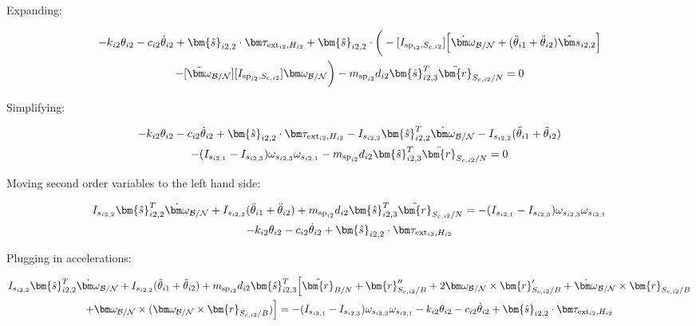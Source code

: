 Expanding:

\begin{multline}
	-k_{i2} \theta_{i2} - c_{i2} \dot{\theta}_{i2} + \bm{\hat{s}}_{i2,2} \cdot \bm \tau_{\text{ext}_{i2},H_{i2}} + \bm{\hat{s}}_{i2,2} \cdot \bigg(-[I_{\text{sp}_{i2},S_{c,i2}}] \Big[\dot{\bm \omega}_{\cal{B/N}} + (\ddot{\theta}_{i1}  + \ddot{\theta}_{i2})\hat{\bm s}_{i2,2}\Big]  \\
	-[\tilde{\bm \omega}_{\cal{B/N}}] [I_{\text{sp}_{i2},S_{c,i2}}] \bm \omega_{\cal{B/N}} \bigg)
	- m_{\text{sp}_{i2}} d_{i2}\bm{\hat{s}}_{i2,3}^T \ddot{\bm{r}}_{S_{c,i2}/N} = 0
\end{multline}

Simplifying:

\begin{multline}
	-k_{i2} \theta_{i2} - c_{i2} \dot{\theta}_{i2} + \bm{\hat{s}}_{i2,2} \cdot \bm \tau_{\text{ext}_{i2},H_{i2}} - I_{s_{i2,2}} \bm{\hat{s}}_{i2,2}^T \dot{\bm \omega}_{\cal{B/N}} - I_{s_{i2,2}} (\ddot{\theta}_{i1}  + \ddot{\theta}_{i2})  \\
	- (I_{s_{i2,1}} - I_{s_{i2,3}}) \omega_{s_{i2,3}} \omega_{s_{i2,1}}
	- m_{\text{sp}_{i2}} d_{i2}\bm{\hat{s}}_{i2,3}^T \ddot{\bm{r}}_{S_{c,i2}/N} = 0
\end{multline}

Moving second order variables to the left hand side:

\begin{multline}
	I_{s_{i2,2}} \bm{\hat{s}}_{i2,2}^T \dot{\bm \omega}_{\cal{B/N}} + I_{s_{i2,2}} (\ddot{\theta}_{i1}  + \ddot{\theta}_{i2}) + m_{\text{sp}_{i2}} d_{i2}\bm{\hat{s}}_{i2,3}^T \ddot{\bm{r}}_{S_{c,i2}/N} = - (I_{s_{i2,1}} - I_{s_{i2,3}}) \omega_{s_{i2,3}} \omega_{s_{i2,1}} \\-k_{i2} \theta_{i2} - c_{i2} \dot{\theta}_{i2}
	+ \bm{\hat{s}}_{i2,2} \cdot \bm \tau_{\text{ext}_{i2},H_{i2}}
\end{multline}

Plugging in accelerations:

\begin{multline}
	I_{s_{i2,2}} \bm{\hat{s}}_{i2,2}^T \dot{\bm \omega}_{\cal{B/N}} + I_{s_{i2,2}} (\ddot{\theta}_{i1}  + \ddot{\theta}_{i2}) + m_{\text{sp}_{i2}} d_{i2}\bm{\hat{s}}_{i2,3}^T \Big[\ddot{\bm{r}}_{B/N} + \bm{r}''_{S_{c,i2}/B} + 2 \bm\omega_{\cal B/N} \times \bm{r}'_{S_{c,i2}/B} +  \dot{\bm\omega}_{\cal B/N} \times \bm{r}_{S_{c,i2}/B} \\
	+ \bm\omega_{\cal B/N} \times (\bm\omega_{\cal B/N} \times \bm{r}_{S_{c,i2}/B})\Big] = - (I_{s_{i2,1}} - I_{s_{i2,3}}) \omega_{s_{i2,3}} \omega_{s_{i2,1}} -k_{i2} \theta_{i2} - c_{i2} \dot{\theta}_{i2}
	+ \bm{\hat{s}}_{i2,2} \cdot \bm \tau_{\text{ext}_{i2},H_{i2}}
\end{multline}

